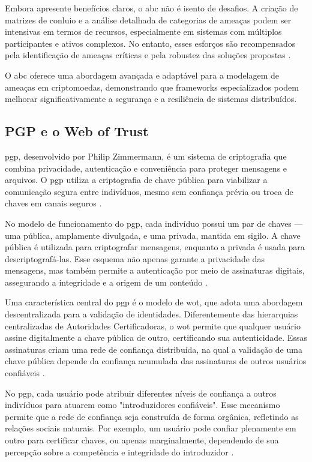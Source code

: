 Embora apresente benefícios claros, o \gls{abc} não é isento de desafios. A
criação de matrizes de conluio e a análise detalhada de categorias de
ameaças podem ser intensivas em termos de recursos, especialmente em
sistemas com múltiplos participantes e ativos complexos. No entanto,
esses esforços são recompensados pela identificação de ameaças
críticas e pela robustez das soluções propostas \cite{AbcCrypto}.

O \gls{abc} oferece uma abordagem avançada e adaptável para a modelagem de
ameaças em criptomoedas, demonstrando que frameworks especializados
podem melhorar significativamente a segurança e a resiliência de
sistemas distribuídos.


\subsection{PGP e o Web of Trust}
\label{subsec:pgp_web_of_trust}

\gls{pgp}, desenvolvido por Philip Zimmermann, é um sistema de
criptografia que combina privacidade, autenticação e conveniência para proteger
mensagens e arquivos. O \gls{pgp} utiliza a criptografia de chave pública para
viabilizar a comunicação segura entre indivíduos, mesmo sem confiança prévia ou
troca de chaves em canais seguros \cite{Pgp}.

No modelo de funcionamento do \gls{pgp}, cada indivíduo possui um par de chaves — uma
pública, amplamente divulgada, e uma privada, mantida em sigilo. A chave pública
é utilizada para criptografar mensagens, enquanto a privada é usada para
descriptografá-las. Esse esquema não apenas garante a privacidade das mensagens,
mas também permite a autenticação por meio de assinaturas digitais, assegurando
a integridade e a origem de um conteúdo \cite{Pgp}.

Uma característica central do \gls{pgp} é o modelo de \gls{wot}, que adota
uma abordagem descentralizada para a validação de identidades. Diferentemente
das hierarquias centralizadas de Autoridades Certificadoras, o \gls{wot} permite
que qualquer usuário assine digitalmente a chave pública de outro, certificando
sua autenticidade. Essas assinaturas criam uma rede de confiança distribuída, na
qual a validação de uma chave pública depende da confiança acumulada das
assinaturas de outros usuários confiáveis \cite{Pgp}.

No \gls{pgp}, cada usuário pode atribuir diferentes níveis de confiança a outros
indivíduos para atuarem como "introduzidores confiáveis". Esse mecanismo permite
que a rede de confiança seja construída de forma orgânica, refletindo as
relações sociais naturais. Por exemplo, um usuário pode confiar plenamente em
outro para certificar chaves, ou apenas marginalmente, dependendo de sua
percepção sobre a competência e integridade do introduzidor \cite{Pgp}.

